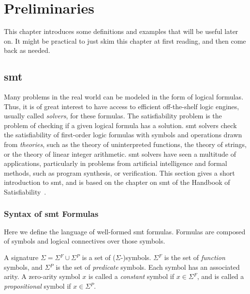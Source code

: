 \chapter{Preliminaries}
\label{chapter:preliminaries}

This chapter introduces some definitions and examples that will be useful later
on. It might be practical to just skim this chapter at first reading, and then
come back as needed.

\section{\gls{smt}}
\label{sec:smt}

Many problems in the real world can be modeled in the form of logical formulas.
Thus, it is of great interest to have access to efficient off-the-shelf
logic engines, usually called \textit{solvers}, for these formulas.
The satisfiability problem is the problem of checking if a given logical formula
has a solution.
\gls{smt} solvers check the satisfiability of first-order logic formulas with
symbols and operations drawn from \textit{theories}, such as the theory of
uninterpreted functions, the theory of strings, or the theory of linear integer
arithmetic.
\gls{smt} solvers have seen a multitude of applications, particularly in
problems from artificial intelligence and formal methods, such as program
synthesis, or verification.
This section gives a short introduction to \gls{smt}, and is based on the
chapter on \gls{smt} of the Handbook of Satisfiability~\cite{Biere:2009:HSV}.

\subsection{Syntax of \gls{smt} Formulas}
\label{sec:smt-syntax}

Here we define the language of well-formed \gls{smt} formulas. Formulas are
composed of symbols and logical connectives over those symbols.

\begin{definition}[Signature]
  A signature $\Sigma{} = \Sigma{}^F \cup{} \Sigma{}^P$ is a set of
  ($\Sigma{}$-)symbols.
  $\Sigma{}^F$ is the set of \textit{function} symbols, and $\Sigma{}^P$ is the
  set of \textit{predicate} symbols.
  Each symbol has an associated arity. A zero-arity symbol $x$ is called a
  \textit{constant} symbol if $x \in \Sigma{}^F$, and is called a
  \textit{propositional} symbol if $x \in \Sigma{}^P$.
\end{definition}

